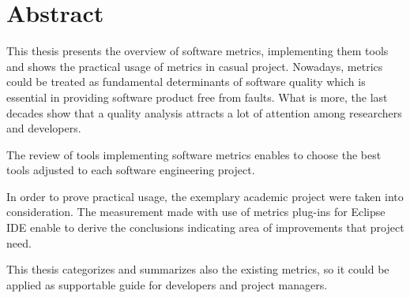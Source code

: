 \chapter*{Abstract}
\label{roz:abstract}

This thesis presents the overview of software metrics, implementing them tools and shows the practical usage of metrics in casual project. Nowadays, metrics could be treated as fundamental determinants of software quality which is essential in providing software product free from faults. What is more, the last decades show that a quality analysis attracts a lot of attention among researchers and developers.

The review of tools implementing software metrics enables to choose the best tools adjusted to each software engineering project. 
 
In order to prove practical usage, the exemplary academic project were taken into consideration. The measurement made with use of metrics plug-ins for Eclipse IDE enable to derive the conclusions indicating area of improvements that project need. 

This thesis categorizes and summarizes also the existing metrics, so it could be applied as supportable guide for developers and project managers. 